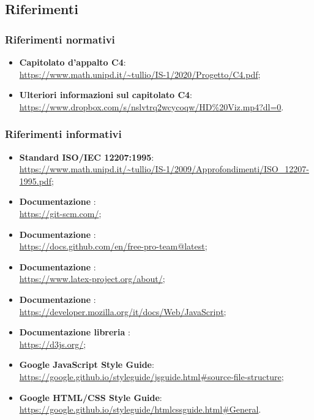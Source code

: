 \subsection{Riferimenti}

\subsubsection{Riferimenti normativi}

\begin{itemize}
    \item \textbf{Capitolato d'appalto \textsc{C4}}: \\
    \url{https://www.math.unipd.it/~tullio/IS-1/2020/Progetto/C4.pdf};
    \item \textbf{Ulteriori informazioni sul capitolato C4}: \\
    \url{https://www.dropbox.com/s/nslvtrq2wcycoqw/HD\%20Viz.mp4?dl=0}.
\end{itemize}

\subsubsection{Riferimenti informativi}
\begin{itemize}
    \item \textbf{Standard ISO/IEC 12207:1995}: \\
    \url{https://www.math.unipd.it/~tullio/IS-1/2009/Approfondimenti/ISO_12207-1995.pdf};
    \item \textbf{Documentazione }: \\
    \url{https://git-scm.com/};
    \item \textbf{Documentazione }: \\
    \url{https://docs.github.com/en/free-pro-team@latest};
    \item \textbf{Documentazione \glossario{\LaTeX}}: \\
    \url{https://www.latex-project.org/about/};
    \item \textbf{Documentazione }: \\
    \url{https://developer.mozilla.org/it/docs/Web/JavaScript};
    \item \textbf{Documentazione libreria }: \\
    \url{https://d3js.org/};
	\item \textbf{Google JavaScript Style Guide}: \\
	\url{https://google.github.io/styleguide/jsguide.html#source-file-structure};
	\item \textbf{Google HTML/CSS Style Guide}: \\
	\url{https://google.github.io/styleguide/htmlcssguide.html#General}.
\end{itemize}
